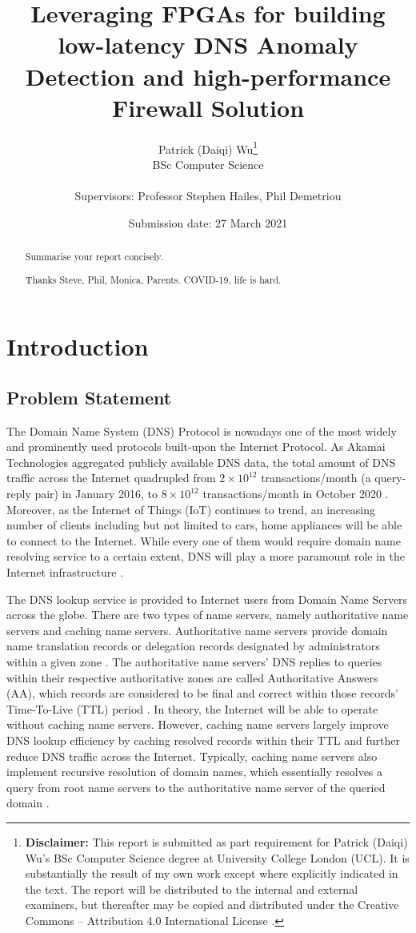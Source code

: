 \documentclass[a4paper]{report}
\title{{\vspace{-14em}}
{{\Huge Leveraging FPGAs for building low-latency DNS Anomaly Detection and high-performance Firewall Solution}} \\
{\large}}
\date{Submission date: 27 March 2021}
\author{Patrick (Daiqi) Wu\thanks{
{\bf Disclaimer:}
This report is submitted as part requirement for Patrick (Daiqi) Wu's BSc Computer Science degree at University College London (UCL). It is
substantially the result of my own work except where explicitly indicated in the text.
The report will be distributed to the internal and external examiners, but thereafter may be copied and distributed under the Creative Commons -- Attribution 4.0 International License \cite{cc-by-4.0}.}
\\
BSc Computer Science\\ \\
Supervisors: Professor Stephen Hailes, Phil Demetriou}
\begin{document}
 
\onehalfspacing
\maketitle
\begin{abstract}
Summarise your report concisely.
\end{abstract}

\renewcommand{\abstractname}{Acknowledgements}
\begin{abstract}
Thanks Steve, Phil, Monica, Parents. COVID-19, life is hard.
\end{abstract}

\tableofcontents
\setcounter{page}{1}

\chapter{Introduction}

\section{Problem Statement}
The Domain Name System (DNS) Protocol is nowadays one of the most widely and prominently used protocols built-upon the Internet Protocol. As Akamai Technologies aggregated publicly available DNS data, the total amount of DNS traffic across the Internet quadrupled from $ 2 \times 10^{12}$ transactions/month (a query-reply pair) in January 2016, to $8 \times 10^{12}$ transactions/month in October 2020 \cite{DNS-Trends-and-Traffic}. Moreover, as the Internet of Things (IoT) continues to trend, an increasing number of clients including but not limited to cars, home appliances will be able to connect to the Internet. While every one of them would require domain name resolving service to a certain extent, DNS will play a more paramount role in the Internet infrastructure \cite{satam2015anomaly}.

The DNS lookup service is provided to Internet users from Domain Name Servers across the globe. There are two types of name servers, namely authoritative name servers and caching name servers. Authoritative name servers provide domain name translation records or delegation records designated by administrators within a given zone \cite{BCP-219}. The authoritative name servers' DNS replies to queries within their respective authoritative zones are called Authoritative Answers (AA), which records are considered to be final and correct within those records' Time-To-Live (TTL) period \cite{BCP-219, RFC-1035}. In theory, the Internet will be able to operate without caching name servers. However, caching name servers largely improve DNS lookup efficiency by caching resolved records within their TTL and further reduce DNS traffic across the Internet. Typically, caching name servers also implement recursive resolution of domain names, which essentially resolves a query from root name servers to the authoritative name server of the queried domain \cite{finch-2015}.
\end{document}
